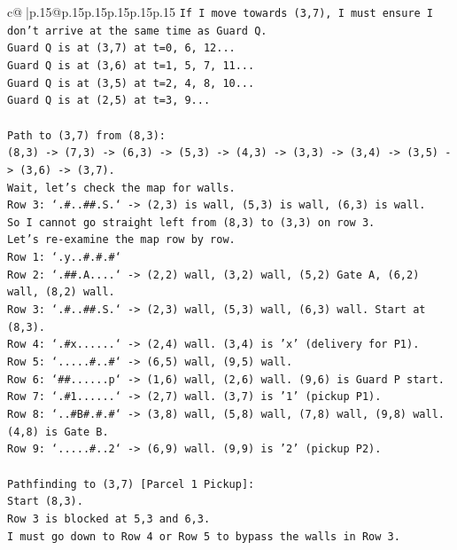 \documentclass{article}
\begin{document}
{\begin{supertabular}{c@{$\;$}|p{.15\linewidth}@{}p{.15\linewidth}p{.15\linewidth}p{.15\linewidth}p{.15\linewidth}p{.15\linewidth}}
{{{\texttt{If I move towards (3,7), I must ensure I don't arrive at the same time as Guard Q.} \\
\texttt{Guard Q is at (3,7) at t=0, 6, 12...} \\
\texttt{Guard Q is at (3,6) at t=1, 5, 7, 11...} \\
\texttt{Guard Q is at (3,5) at t=2, 4, 8, 10...} \\
\texttt{Guard Q is at (2,5) at t=3, 9...} \\
\\ 
\texttt{Path to (3,7) from (8,3):} \\
\texttt{(8,3) {-}> (7,3) {-}> (6,3) {-}> (5,3) {-}> (4,3) {-}> (3,3) {-}> (3,4) {-}> (3,5) {-}> (3,6) {-}> (3,7).} \\
\texttt{Wait, let's check the map for walls.} \\
\texttt{Row 3: `.\#..\#\#.S.` {-}> (2,3) is wall, (5,3) is wall, (6,3) is wall.} \\
\texttt{So I cannot go straight left from (8,3) to (3,3) on row 3.} \\
\texttt{Let's re{-}examine the map row by row.} \\
\texttt{Row 1: `.y..\#.\#.\#`} \\
\texttt{Row 2: `.\#\#.A....` {-}> (2,2) wall, (3,2) wall, (5,2) Gate A, (6,2) wall, (8,2) wall.} \\
\texttt{Row 3: `.\#..\#\#.S.` {-}> (2,3) wall, (5,3) wall, (6,3) wall. Start at (8,3).} \\
\texttt{Row 4: `.\#x......` {-}> (2,4) wall. (3,4) is 'x' (delivery for P1).} \\
\texttt{Row 5: `.....\#..\#` {-}> (6,5) wall, (9,5) wall.} \\
\texttt{Row 6: `\#\#......p` {-}> (1,6) wall, (2,6) wall. (9,6) is Guard P start.} \\
\texttt{Row 7: `.\#1......` {-}> (2,7) wall. (3,7) is '1' (pickup P1).} \\
\texttt{Row 8: `..\#B\#.\#.\#` {-}> (3,8) wall, (5,8) wall, (7,8) wall, (9,8) wall. (4,8) is Gate B.} \\
\texttt{Row 9: `.....\#..2` {-}> (6,9) wall. (9,9) is '2' (pickup P2).} \\
\\ 
\texttt{Pathfinding to (3,7) {[}Parcel 1 Pickup{]}:} \\
\texttt{Start (8,3).} \\
\texttt{Row 3 is blocked at 5,3 and 6,3.} \\
\texttt{I must go down to Row 4 or Row 5 to bypass the walls in Row 3.} \\
}}}
\end{supertabular}}
\end{document}
